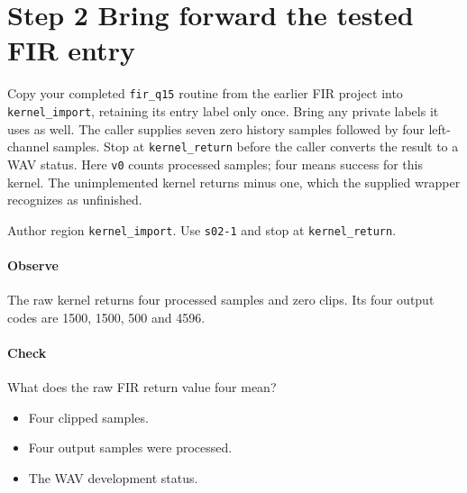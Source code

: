 \section{Step 2 Bring forward the tested FIR entry}\label{pcm-wav-s02}
Copy your completed \texttt{fir\_q15} routine from the earlier FIR project into \texttt{kernel\_import}, retaining its entry label only once. Bring any private labels it uses as well. The caller supplies seven zero history samples followed by four left-channel samples. Stop at \texttt{kernel\_return} before the caller converts the result to a WAV status. Here \texttt{v0} counts processed samples; four means success for this kernel. The unimplemented kernel returns minus one, which the supplied wrapper recognizes as unfinished.

Author region \texttt{kernel\_import}. Use \texttt{s02-1} and stop at \texttt{kernel\_return}.

\paragraph{Observe} The raw kernel returns four processed samples and zero clips. Its four output codes are 1500, 1500, 500 and 4596.

\paragraph{Check} What does the raw FIR return value four mean?
\begin{itemize}
\item[A.] Four clipped samples.
\item[B.] Four output samples were processed.
\item[C.] The WAV development status.
\end{itemize}
